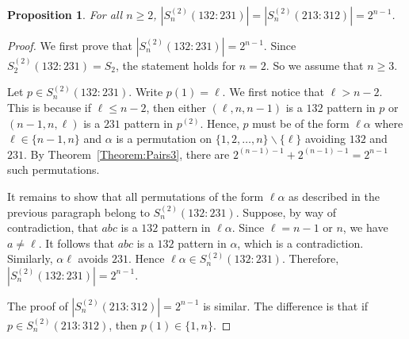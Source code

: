 \documentclass[11pt]{article}
\newtheorem{proposition}[theorem]{Proposition}
\theoremstyle{definition}
\numberwithin{equation}{section}
\begin{document}
\begin{proposition}
For all $n\geq2$, $|S_n^{(2)}(132:231)|=|S_n^{(2)}(213:312)|=2^{n-1}$.
\end{proposition}
\begin{proof}
We first prove that $|S_n^{(2)}(132:231)|=2^{n-1}$. Since $S_2^{(2)}(132:231)=S_2$, the statement holds for $n=2$. So we assume that $n\geq3$.

    Let $p\in S_n^{(2)}(132:231)$. Write $p(1)=\ell$. We first notice that $\ell>n-2$. This is because if $\ell\leq n-2$, then either $(\ell,n,n-1)$ is a $132$ pattern in $p$ or $(n-1,n,\ell)$ is a $231$ pattern in $p^{(2)}$. Hence, $p$ must be of the form $\ell\alpha$ where $\ell\in\{n-1,n\}$ and $\alpha$ is a permutation on $\{1,2,\ldots,n\}\backslash\{\ell\}$ avoiding $132$ and $231$. By Theorem~\ref{Theorem:Pairs3}, there are $2^{(n-1)-1}+2^{(n-1)-1}=2^{n-1}$ such permutations.

    It remains to show that all permutations of the form $\ell\alpha$ as described in the previous paragraph belong to $S_n^{(2)}(132:231)$. 
Suppose, by way of contradiction, that $abc$ is a $132$ pattern in $\ell\alpha$. Since $\ell=n-1$ or $n$, we have $a\neq \ell$. It follows that $abc$ is a $132$ pattern in $\alpha$, which is a contradiction. Similarly, $\alpha\ell$ avoids $231$. Hence $\ell\alpha\in S_n^{(2)}(132:231)$. Therefore, $|S_n^{(2)}(132:231)|=2^{n-1}$.

    The proof of $|S_n^{(2)}(213:312)|=2^{n-1}$ is similar. The difference is that if $p\in S_n^{(2)}(213:312)$, then $p(1)\in\{1,n\}$.
\end{proof}
\end{document}
